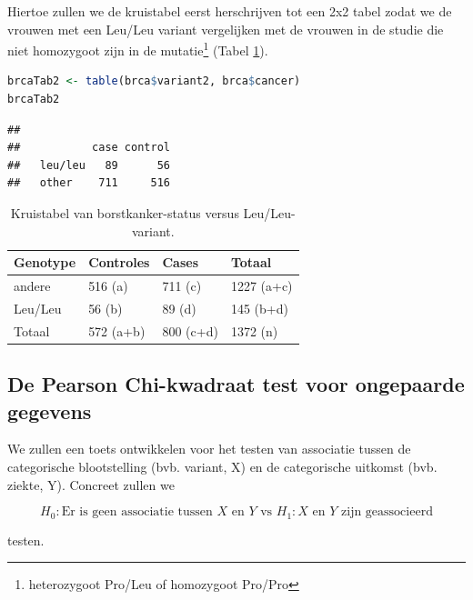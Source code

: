 \documentclass[
  12pt,dutch,coursenotes]{book}
\theoremstyle{definition}
\theoremstyle{definition}
\theoremstyle{definition}
\theoremstyle{definition}
\theoremstyle{remark}
\begin{document}
Hiertoe zullen we de kruistabel eerst herschrijven tot een 2x2 tabel zodat we de vrouwen met een Leu/Leu variant vergelijken met de vrouwen in de studie die niet homozygoot zijn in de mutatie\footnote{heterozygoot Pro/Leu of homozygoot Pro/Pro} (Tabel \ref{tab:leu4}).

\begin{lstlisting}[language=R]
brcaTab2 <- table(brca$variant2, brca$cancer)
brcaTab2
\end{lstlisting}

\begin{lstlisting}
##          
##           case control
##   leu/leu   89      56
##   other    711     516
\end{lstlisting}

\begin{table}

\caption{\label{tab:leu4}Kruistabel van borstkanker-status versus Leu/Leu-variant.}
\centering
\begin{tabular}[t]{llll}
\toprule
Genotype & Controles & Cases & Totaal\\
\midrule
andere & 516 (a) & 711 (c) & 1227 (a+c)\\
Leu/Leu & 56 (b) & 89 (d) & 145 (b+d)\\
Totaal & 572 (a+b) & 800 (c+d) & 1372 (n)\\
\bottomrule
\end{tabular}
\end{table}

\hypertarget{de-pearson-chi-kwadraat-test-voor-ongepaarde-gegevens}{%
\subsection{De Pearson Chi-kwadraat test voor ongepaarde gegevens}\label{de-pearson-chi-kwadraat-test-voor-ongepaarde-gegevens}}

We zullen een toets ontwikkelen voor het testen van associatie tussen de categorische blootstelling (bvb. variant, X) en de categorische uitkomst (bvb. ziekte, Y).
Concreet zullen we

\[H_0: \text{Er is geen associatie tussen } X \text{ en } Y \text{ vs } H_1: X \text{ en } Y \text{ zijn geassocieerd}\]

testen.
\end{document}
